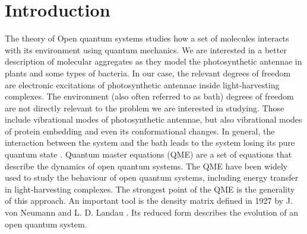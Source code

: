 \chapter*{Introduction}

The theory of Open quantum systems studies how a set of molecules interacts with its environment using quantum mechanics.  We are interested in a better description of molecular aggregates as they model the photosynthetic antennae in plants and some types of bacteria. In our case, the relevant degrees of freedom are electronic excitations of photosynthetic antennae inside light-harvesting complexes. The environment (also often referred to as bath) degrees of freedom are not directly relevant to the problem we are interested in studying. Those include vibrational modes of photosynthetic antennae, but also vibrational modes of protein embedding and even its conformational changes. In general, the interaction between the system and the bath leads to the system losing its pure quantum state \cite{cao_quantum_2020} \cite{mancal_decade_2020}. Quantum master equations (QME) \cite{Valkunas2013-op} are a set of equations that describe the dynamics of open quantum systems. The QME have been widely used to study the behaviour of open quantum systems, including energy transfer in light-harvesting complexes. The strongest point of the QME is the generality of this approach. An important tool is the density matrix defined in 1927 by J. von Neumann  \cite{neumann_wahrscheinlichkeitstheoretischer_1927} and L. D. Landau \cite{Landau1927}. Its reduced form describes the evolution of an open quantum system. 

